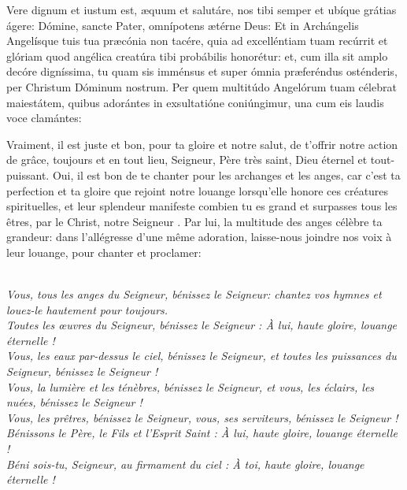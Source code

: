 \documentclass[twoside]{article}
\begin{document}
\begin{paracol}{2}
\switchcolumn
\switchcolumn*

Vere dignum et iustum est, æquum et salutáre,
nos tibi semper et ubíque grátias ágere:
Dómine, sancte Pater, omnípotens ætérne Deus:
Et in Archángelis Angelísque tuis tua præcónia non tacére,
quia ad excelléntiam tuam recúrrit et glóriam
quod angélica creatúra tibi probábilis honorétur:
et, cum illa sit amplo decóre digníssima,
tu quam sis imménsus et super ómnia præferéndus osténderis,
per Christum Dóminum nostrum.
Per quem multitúdo Angelórum tuam célebrat maiestátem,
quibus adorántes in exsultatióne coniúngimur,
una cum eis laudis voce clamántes:

\switchcolumn

Vraiment, il est juste et bon, pour ta gloire et notre salut,
de t'offrir notre action de grâce, toujours et en tout lieu,
Seigneur, Père très saint, Dieu éternel et tout-puissant.
Oui, il est bon de te chanter pour les archanges et les anges,
car c'est ta perfection et ta gloire que rejoint notre louange
lorsqu'elle honore ces créatures spirituelles,
et leur splendeur manifeste combien tu es grand
et surpasses tous les êtres,
par le Christ, notre Seigneur .
Par lui, la multitude des anges célèbre ta grandeur:
dans l'allégresse d'une même adoration,
laisse-nous joindre nos voix à leur louange,
pour chanter et proclamer:

\end{paracol}



 
\\
\emph{\rr Vous, tous les anges du Seigneur, bénissez le Seigneur: chantez vos hymnes et louez-le hautement pour toujours.\\
\vv {} Toutes les œuvres du Seigneur, bénissez le Seigneur : À lui, haute gloire, louange éternelle !\\
\vv {} Vous, les eaux par-dessus le ciel, bénissez le Seigneur, et toutes les puissances du Seigneur, bénissez le Seigneur !\\
\vv {} Vous, la lumière et les ténèbres, bénissez le Seigneur, et vous, les éclairs, les nuées, bénissez le Seigneur !\\
\vv {} Vous, les prêtres, bénissez le Seigneur, vous, ses serviteurs, bénissez le Seigneur !\\
\vv {} Bénissons le Père, le Fils et l'Esprit Saint : À lui, haute gloire, louange éternelle !\\
\vv {} Béni sois-tu, Seigneur, au firmament du ciel : À toi, haute gloire, louange éternelle !
}
\end{document}
